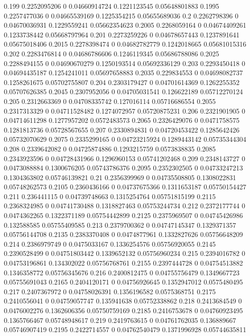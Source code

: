 {0.199 0.2252095206 0 0.04660914724 0.1221123545 0.05648801883
0.1995 0.2257477036 0 0.04665539169 0.1225354215 0.05655689036
0.2 0.2262798396 0 0.04670036931 0.1229559241 0.05662354623
0.2005 0.2268059164 0 0.04674409261 0.1233738442 0.05668797964
0.201 0.2273259226 0 0.04678657443 0.1237891641 0.05675018406
0.2015 0.2278398474 0 0.04682782779 0.1242018665 0.05681015316
0.202 0.2283476814 0 0.04686786606 0.1246119345 0.05686788086
0.2025 0.2288494155 0 0.04690670279 0.1250193514 0.05692336129
0.203 0.2293450418 0 0.04694435187 0.1254241011 0.05697658883
0.2035 0.229834553 0 0.04698082737 0.1258261675 0.05702755807
0.204 0.2303179427 0 0.04701614369 0.1262255352 0.05707626385
0.2045 0.2307952056 0 0.04705031541 0.126622189 0.05712270124
0.205 0.2312663369 0 0.04708335742 0.127016114 0.05716686554
0.2055 0.2317313329 0 0.04711528482 0.1274072957 0.05720875231
0.206 0.2321901905 0 0.04714611298 0.1277957202 0.0572483573
0.2065 0.2326429076 0 0.0471758575 0.1281813736 0.05728567655
0.207 0.2330894831 0 0.04720453422 0.1285642426 0.05732070629
0.2075 0.2335299165 0 0.04723215924 0.1289443142 0.05735344304
0.208 0.2339642082 0 0.04725874886 0.1293215759 0.0573838835
0.2085 0.2343923596 0 0.04728431966 0.1296960153 0.05741202468
0.209 0.2348143727 0 0.0473088884 0.1300676205 0.05743786376
0.2095 0.2352302505 0 0.04733247213 0.1304363802 0.05746139821
0.21 0.2356399969 0 0.04735508805 0.1308022831 0.05748262573
0.2105 0.2360436166 0 0.04737675366 0.1311653187 0.05750154427
0.211 0.236441115 0 0.04739748663 0.1315254764 0.05751815199
0.2115 0.2368324985 0 0.04741730488 0.1318827463 0.05753244734
0.212 0.2372177744 0 0.0474362265 0.1322371189 0.05754442899
0.2125 0.2375969507 0 0.04745426986 0.132588585 0.05755409585
0.213 0.2379700362 0 0.04747145347 0.1329371357 0.05756144708
0.2135 0.2383370408 0 0.0474877961 0.1332827626 0.05756648209
0.214 0.2386979749 0 0.0475033167 0.1336254576 0.05756920055
0.2145 0.2390528499 0 0.04751803442 0.1339652132 0.05756960234
0.215 0.2394016782 0 0.04753196861 0.134302022 0.05756768761
0.2155 0.2397444728 0 0.04754513882 0.1346358772 0.05756345676
0.216 0.2400812475 0 0.04755756479 0.1349667723 0.05755691043
0.2165 0.2404120171 0 0.04756926645 0.1352947012 0.0575480495
0.217 0.2407367972 0 0.04758026391 0.1356196582 0.0575368751
0.2175 0.2410556041 0 0.04759057747 0.135941638 0.05752338862
0.218 0.2413684549 0 0.0476002276 0.1362606356 0.05750759169
0.2185 0.2416753678 0 0.04760923495 0.1365766467 0.05748948617
0.219 0.2419763615 0 0.04761762035 0.136889667 0.05746907419
0.2195 0.2422714557 0 0.04762540479 0.1371996928 0.05744635811
}
